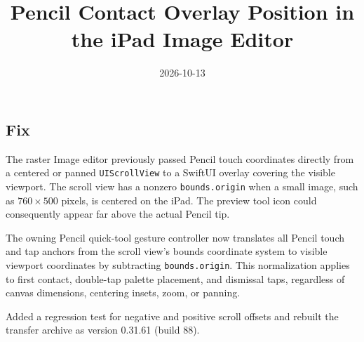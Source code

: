 \documentclass[a4paper]{article}
\title{Pencil Contact Overlay Position in the iPad Image Editor}
\date{2026-10-13}
\begin{document}
   \maketitle

   \begin{preview}
      \section*{Fix}
      The raster Image editor previously passed Pencil touch coordinates
      directly from a centered or panned \texttt{UIScrollView} to a SwiftUI
      overlay covering the visible viewport. The scroll view has a
      nonzero \texttt{bounds.origin} when a small image, such as
      \(760 \times 500\) pixels, is centered on the iPad. The preview
      tool icon could consequently appear far above the actual Pencil tip.

      The owning Pencil quick-tool gesture controller now translates all
      Pencil touch and tap anchors from the scroll view's bounds coordinate
      system to visible viewport coordinates by subtracting
      \texttt{bounds.origin}. This normalization applies to first
      contact, double-tap palette placement, and dismissal taps, regardless
      of canvas dimensions, centering insets, zoom, or panning.

      Added a regression test for negative and positive scroll offsets
      and rebuilt the transfer archive as version 0.31.61 (build 88).
   \end{preview}
\end{document}
